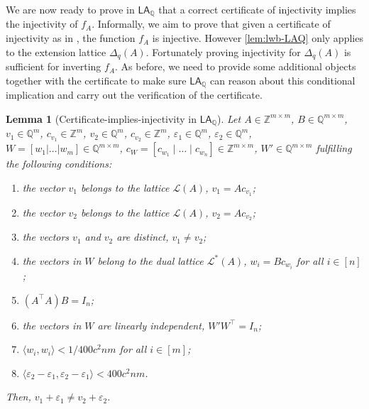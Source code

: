 \documentclass[11pt]{article}
\newcommand{\LAQ}{\mathsf{LA}_\mathbb{Q}}
\theoremstyle{definition}
\theoremstyle{plain}
\newtheorem{lemma}[definition]{Lemma}
\theoremstyle{remark}
\newcommand{\LL}{\mathcal{L}}
\newcommand{\bZ}{\mathbb{Z}}
\newcommand{\bQ}{\mathbb{Q}}
\begin{document}
We are now ready to prove in $\LAQ$ that a correct certificate of injectivity implies the injectivity of $f_A$. Informally, we aim to prove that given a certificate of injectivity as in , the function $f_A$ is injective. However \cref{lem:lwb-LAQ} only applies to the extension lattice $\Delta_q(A)$. Fortunately proving injectivity for $\Delta_q(A)$ is sufficient for inverting $f_A$. As before, we need to provide some additional objects together with the certificate to make sure $\LAQ$ can reason about this conditional implication and carry out the verification of the certificate. 

\begin{lemma}[Certificate-implies-injectivity in $\LAQ$]
\label{lem:inj-formal}
Let $A \in\mathbb{Z}^{m\times m}$, $B \in \bQ^{m\times m}$, $v_1 \in \bQ^m$, $c_{v_1} \in \bZ^m$, $v_2\in \bQ^m$, $c_{v_2} \in \bZ^m$, $\varepsilon_1 \in \bQ^m$, $\varepsilon_2 \in \bQ^m$, $W =[w_1|\dots|w_m]\in \mathbb{Q}^{m\times m}$, $c_{W} = [c_{w_1} \mid \dots \mid c_{w_n}] \in \mathbb{Z}^{m\times m}$, $W' \in \bQ^{m \times m}$ fulfilling the following conditions:


\begin{enumerate}
    \item the vector $v_1$ belongs to the lattice $\LL(A)$, $v_1 = Ac_{v_1}$;
    \item the vector $v_2$ belongs to the lattice $\LL(A)$, $v_2 = Ac_{v_2}$;
    \item the vectors $v_1$ and $v_2$ are distinct, $v_1 \neq v_2$;
    \item the vectors in $W$ belong to the dual lattice $\LL^*(A)$, $w_i = Bc_{w_i}$ for all $i \in [n]$;
    \item $(A^\intercal A)B = I_n$;
    \item the vectors in $W$ are linearly independent, $W'W^\intercal = I_n$;
    \item $\langle w_i, w_i \rangle < 1/400c^2nm$ for all $i \in[m]$;
    \item $\langle \varepsilon_2 - \varepsilon_1, \varepsilon_2 - \varepsilon_1 \rangle < 400c^2nm$. 
\end{enumerate}


Then, $v_1+\varepsilon_1\neq v_2 +\varepsilon_2$.


\end{lemma}
\end{document}
